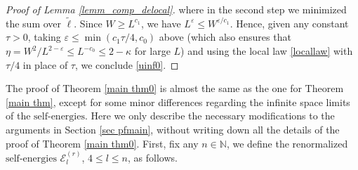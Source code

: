 \documentclass{article}
\newcommand{\1}{\mathds{1}}
\numberwithin{equation}{section}
\newcommand{\e}{{\varepsilon}}
\newcommand{\wt}{\widetilde}
\renewcommand{\leq}{\leqslant}
\renewcommand{\geq}{\geqslant}
\renewcommand{\le}{\leq}
\renewcommand{\ge}{\geq}
\newcommand{\N}{\mathbb{N}}
\newcommand{\selfs}{\text{self-energies}}
\theoremstyle{plain} %
\theoremstyle{remark}
\newcommand{\Sele}{{\mathcal E}}
\begin{document}
\begin{proof}[Proof of Lemma \ref{lemm_comp_delocal}]
	where in the second step we minimized the sum over $\wt\ell$. Since $W\ge L^{c_1}$, we have $L^\e\le W^{\e/c_1}$. Hence, given any constant $\tau>0$, taking $\e\le \min(c_1\tau/4,c_0)$ above (which also ensures that $\eta=W^{2}/L^{2-\e}\le L^{-c_0}\le 2-\kappa$ for large $L$) and using the local law \eqref{locallaw} with $\tau/4$ in place of $\tau$, we conclude \eqref{uinf0}.
\end{proof}


The proof of Theorem \ref{main thm0} is almost the same as the one for Theorem \ref{main thm}, except for some minor differences regarding the infinite space limits of the $\selfs$. Here we only describe the necessary modifications to the arguments in Section \ref{sec pfmain}, without writing down all the details of the proof of Theorem \ref{main thm0}. First, fix any $n\in \N$, we define the renormalized $\selfs$ $ \Sele_l^{(r)} $, $4\le l \le n$, as follows. 
\end{document}
